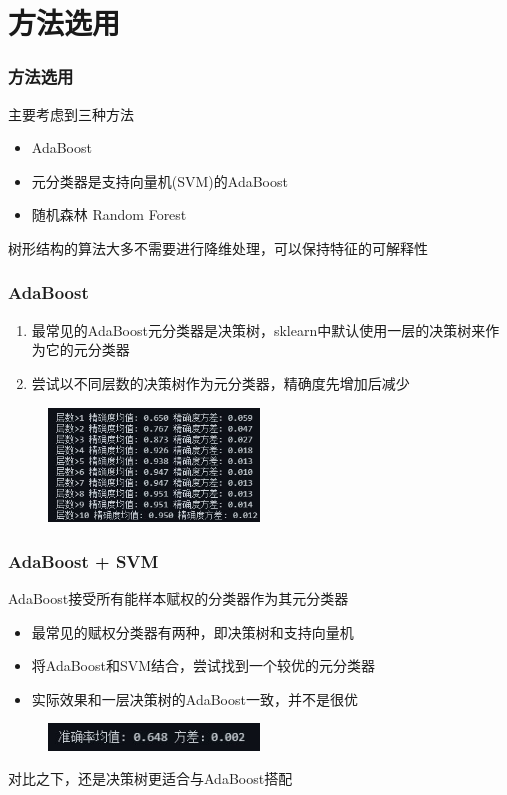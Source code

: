 \documentclass[aspectratio=43, 12pt, utf8, mathserif]{ctexbeamer} %
\begin{document}
\section{方法选用}
\begin{frame}
    \frametitle{方法选用}
    主要考虑到三种方法
    \vspace{1cm}
    \begin{itemize}
        \item AdaBoost
        \item 元分类器是支持向量机(SVM)的AdaBoost
        \item 随机森林 Random Forest
    \end{itemize}
    \vspace{1cm}
    树形结构的算法大多不需要进行降维处理，可以保持特征的可解释性
\end{frame}

\begin{frame}
    \frametitle{AdaBoost}
    \begin{enumerate}
        \item 最常见的AdaBoost元分类器是决策树，sklearn中默认使用一层的决策树来作为它的元分类器
        \item 尝试以不同层数的决策树作为元分类器，精确度先增加后减少
    \end{enumerate}
    \begin{figure}[h]
        \centering
        \includegraphics[width=0.5\textwidth]{image/adaboost1.jpg}
    \end{figure}
\end{frame}

\begin{frame}
    \frametitle{AdaBoost + SVM}
    AdaBoost接受所有能样本赋权的分类器作为其元分类器
    \vspace{0.5cm}
    \begin{itemize}
        \item 最常见的赋权分类器有两种，即决策树和支持向量机
        \item 将AdaBoost和SVM结合，尝试找到一个较优的元分类器
        \item 实际效果和一层决策树的AdaBoost一致，并不是很优
    \end{itemize}    
    \begin{figure}[h]
        \centering
        \includegraphics[width=0.5\textwidth]{image/adaboost2.jpg}
    \end{figure}
    \vspace{0.5cm}
    对比之下，还是决策树更适合与AdaBoost搭配
\end{frame}
\end{document}
